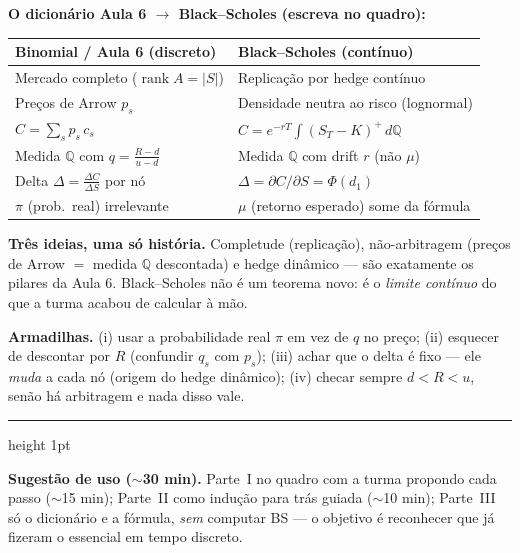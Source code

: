 \documentclass[11pt]{article}
\newcommand{\Eq}{\mathbb{Q}}
\begin{document}
\noindent\textbf{O dicionário Aula 6 $\to$ Black--Scholes (escreva no quadro):}
\begin{center}
\renewcommand{\arraystretch}{1.25}
\begin{tabular}{@{}p{}@{\quad$\longrightarrow$\quad}p{}@{}}
\hline
\textbf{Binomial / Aula 6 (discreto)} & \textbf{Black--Scholes (contínuo)}\\
\hline
Mercado completo ($\operatorname{rank}A=|S|$) & Replicação por hedge contínuo\\
Preços de Arrow $p_s$ & Densidade neutra ao risco (lognormal)\\
$C=\sum_s p_s\,c_s$ & $C=e^{-rT}\!\int (S_T-K)^+\,d\Eq$\\
Medida $\Eq$ com $q=\frac{R-d}{u-d}$ & Medida $\Eq$ com drift $r$ (não $\mu$)\\
Delta $\Delta=\frac{\Delta C}{\Delta S}$ por nó & $\Delta=\partial C/\partial S=\Phi(d_1)$\\
$\pi$ (prob.\ real) irrelevante & $\mu$ (retorno esperado) some da fórmula\\
\hline
\end{tabular}
\end{center}

\begin{intuibox}
\textbf{Três ideias, uma só história.} Completude (replicação), não-arbitragem (preços de Arrow $=$ medida $\Eq$
descontada) e hedge dinâmico --- são exatamente os pilares da Aula 6. Black--Scholes não é um teorema novo: é o
\emph{limite contínuo} do que a turma acabou de calcular à mão.
\end{intuibox}

\begin{armadbox}
\textbf{Armadilhas.} (i) usar a probabilidade real $\pi$ em vez de $q$ no preço; (ii) esquecer de descontar por $R$
(confundir $q_s$ com $p_s$); (iii) achar que o delta é fixo --- ele \emph{muda} a cada nó (origem do hedge dinâmico);
(iv) checar sempre $d<R<u$, senão há arbitragem e nada disso vale.
\end{armadbox}

\bigskip
{\color{insperred!40}\hrule height 1pt}
\smallskip
\noindent\textbf{\color{insperred}Sugestão de uso ($\sim$30 min).} Parte~I no quadro com a turma propondo cada passo
($\sim$15 min); Parte~II como indução para trás guiada ($\sim$10 min); Parte~III só o dicionário e a fórmula,
\emph{sem} computar BS --- o objetivo é reconhecer que já fizeram o essencial em tempo discreto.
\end{document}
